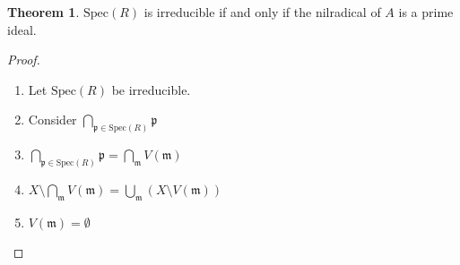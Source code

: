 \documentclass[a4paper]{book}
\theoremstyle{definition}
\newtheorem{theorem}[definition]{Theorem}
\begin{document}
\begin{theorem}
    \(\text{Spec}(R)\) is irreducible if and only if the nilradical of \(A\) is a prime ideal.
\end{theorem}
\begin{proof}
    \begin{enumerate}
        \item Let \(\text{Spec}(R)\) be irreducible.
        \item Consider \(\bigcap_{\mathfrak{p} \in \text{Spec}(R)} \mathfrak{p}\)
        \item \(\bigcap_{\mathfrak{p} \in \text{Spec}(R)} \mathfrak{p} = \bigcap_{\mathfrak{m}} V(\mathfrak{m})\)
        \item \(X \setminus \bigcap_{\mathfrak{m}} V(\mathfrak{m}) = \bigcup_{\mathfrak{m}}(X \setminus V(\mathfrak{m}))\)
        \item \(V(\mathfrak{m}) = \emptyset\)
    \end{enumerate}
\end{proof}
\end{document}
